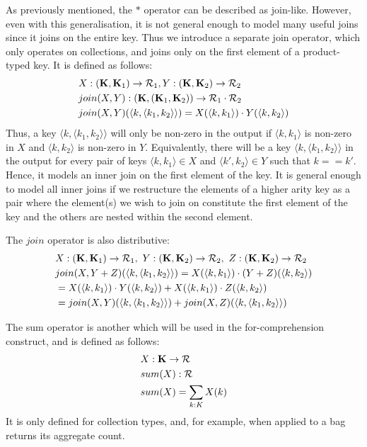 {{{As previously mentioned, the $*$ operator can be described as join-like. However, even with this generalisation, it is not general enough to model many useful joins since it joins on the entire key. Thus we introduce a separate join operator, which only operates on collections, and joins only on the first element of a product-typed key. It is defined as follows:
\begin{equation*}
\begin{split}
& X: (\mathbf{K},\mathbf{K}_1) \rightarrow \mathcal{R}_1,  Y: (\mathbf{K},\mathbf{K}_2) \rightarrow \mathcal{R}_2 \\
& join(X, Y): (\mathbf{K}, (\mathbf{K}_1,\mathbf{K}_2)) \rightarrow \mathcal{R}_1 \cdot \mathcal{R}_2 \\
& join(X, Y)(\langle k, \langle k_1, k_2 \rangle \rangle) = X(\langle k, k_1 \rangle) \cdot Y(\langle k, k_2 \rangle)
\end{split}
\end{equation*}
Thus, a key $\langle k, \langle k_1, k_2 \rangle \rangle$ will only be non-zero in the output if $\langle k, k_1 \rangle$ is non-zero in $X$ and $\langle k, k_2 \rangle$ is non-zero in $Y$. Equivalently, there will be a key  $\langle k, \langle k_1, k_2 \rangle \rangle$ in the output for every pair of keys $\langle k, k_1 \rangle \in X$ and $\langle k', k_2 \rangle \in Y$ such that $k == k'$. Hence, it models an inner join on the first element of the key. It is general enough to model all inner joins if we restructure the elements of a higher arity key as a pair where the element(s) we wish to join on constitute the first element of the key and the others are nested within the second element. 

\noindent The $join$ operator is also distributive:
\begin{equation*}
\begin{split}
&X: (\mathbf{K},\mathbf{K}_1) \rightarrow \mathcal{R}_1,  \ Y: (\mathbf{K},\mathbf{K}_2) \rightarrow \mathcal{R}_2, \ Z: (\mathbf{K},\mathbf{K}_2) \rightarrow \mathcal{R}_2 \\
&join(X,Y+Z)(\langle k, \langle k_1, k_2 \rangle \rangle) = X(\langle k, k_1 \rangle) \cdot (Y+Z)(\langle k, k_2 \rangle) \\
&=X(\langle k, k_1 \rangle) \cdot Y(\langle k, k_2 \rangle) + X(\langle k, k_1 \rangle) \cdot Z(\langle k, k_2 \rangle) \\
&=join(X,Y)(\langle k, \langle k_1, k_2 \rangle \rangle) + join(X,Z)(\langle k, \langle k_1, k_2 \rangle \rangle)
\end{split}
\end{equation*}

The sum operator is another which will be used in the for-comprehension construct, and is defined as follows: 
\begin{equation*}
\begin{split}
 & X: \mathbf{K} \rightarrow \mathcal{R} \\
 & sum(X): \mathcal{R} \\
 & sum(X) = \sum_{k: K} X(k)
\end{split}
\end{equation*}
It is only defined for collection types, and, for example, when applied to a bag returns its aggregate count.
 
}}}

